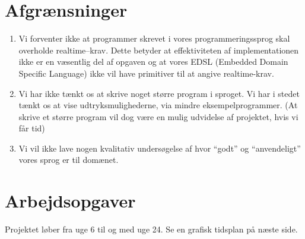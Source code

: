 \documentclass[a4paper,oneside, draft]{memoir}
\newcommand{\EDSL}{EDSL (Embedded Domain Specific Language) \renewcommand{\EDSL}{ EDSL }}
\begin{document}
\section{Afgrænsninger}
\begin{enumerate}

\item Vi forventer ikke at programmer skrevet i vores programmeringssprog skal
  overholde realtime--krav. Dette betyder at effektiviteten af implementationen
  ikke er en væsentlig del af opgaven og at vores \EDSL ikke vil have primitiver
  til at angive realtime-krav.

\item Vi har ikke tænkt os at skrive noget større program i sproget. Vi har i
  stedet tænkt os at vise udtryksmulighederne, via mindre
  eksempelprogrammer. (At skrive et større program vil dog være en mulig
  udvidelse af projektet, hvis vi får tid)

\item Vi vil ikke lave nogen kvalitativ undersøgelse af hvor "`godt"' og
  "`anvendeligt"' vores sprog er til domænet.

\end{enumerate}

\newpage
\section{Arbejdsopgaver}
Projektet løber fra uge 6 til og med uge 24. Se en grafisk tidsplan på
næste side.
\end{document}
